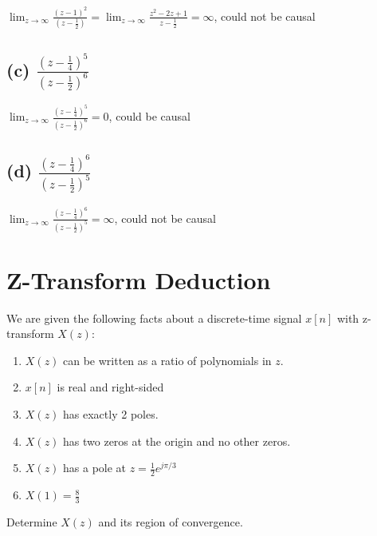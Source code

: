 \documentclass[11pt]{article}
\begin{document}
{\color{blue}
$\lim_{z\rightarrow \infty} \frac{(z-1)^2}{(z-\frac{1}{2})} = \lim_{z\rightarrow \infty} \frac{z^2-2z+1}{z-\frac{1}{2}} = \infty$, could not be causal
}

\subsection*{(c) $ \frac{(z-\frac{1}{4})^5}{(z-\frac{1}{2})^6}$}

{\color{blue}
$\lim_{z\rightarrow \infty} \frac{(z-\frac{1}{4})^5}{(z-\frac{1}{2})^6} = 0$, could be causal
}

\subsection*{(d) $ \frac{(z-\frac{1}{4})^6}{(z-\frac{1}{2})^5}$}

{\color{blue}
$\lim_{z\rightarrow \infty} \frac{(z-\frac{1}{4})^6}{(z-\frac{1}{2})^5} = \infty$, could not  be causal
}

\section{Z-Transform Deduction}
We are given the following facts about a discrete-time signal $x[n]$ with z-transform $X(z)$:
\begin{enumerate}
	\item $X(z)$ can be written as a ratio of polynomials in $z$.
	\item $x[n]$ is real and right-sided
	\item $X(z)$ has exactly 2 poles.
	\item $X(z)$ has two zeros at the origin and no other zeros.
	\item $X(z)$ has a pole at $z=\frac{1}{2}e^{j \pi /3}$
	\item $X(1)=\frac{8}{3}$
\end{enumerate}
Determine $X(z)$ and its region of convergence.  
\end{document}
